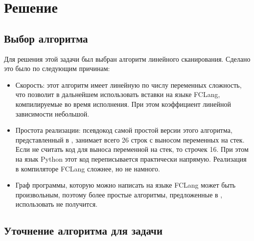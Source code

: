 \documentclass[a4paper,14pt]{extarticle}
\begin{document}
\section{Решение}
\subsection{Выбор алгоритма}

Для решения этой задачи был выбран алгоритм линейного сканирования.
Сделано это было по следующим причинам:
\begin{itemize}
    \item Скорость: этот алгоритм имеет линейную по числу переменных сложность, что позволит в дальнейшем использовать вставки на языке FCLang, компилируемые во время исполнения.
        При этом коэффициент линейной зависимости небольшой.
    \item Простота реализации: псевдокод самой простой версии этого алгоритма, представленный в \cite{poletto_linear_1999}, занимает всего 26 строк с выносом переменных на стек.
        Если не считать код для выноса переменной на стек, то строчек 16.
        При этом на язык Python этот код переписывается практически напрямую.
        Реализация в компиляторе FCLang сложнее, но не намного.
    \item Граф программы, которую можно написать на языке FCLang может быть произвольным, 
        поэтому более простые алгоритмы, предложенные в \cite{hutchison_register_2005}, использовать не получится.
\end{itemize}


\subsection{Уточнение алгоритма для задачи}
\end{document}
